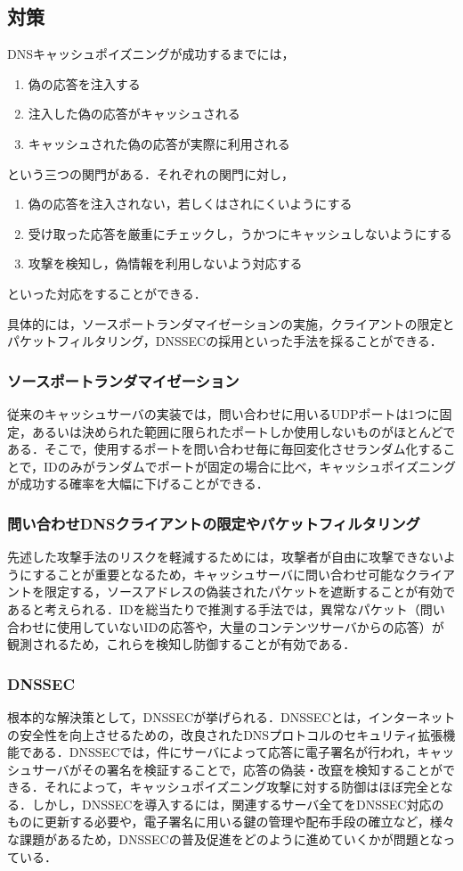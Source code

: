 \subsection{対策}
DNSキャッシュポイズニングが成功するまでには，
\begin{enumerate}
	\item 偽の応答を注入する
	\item 注入した偽の応答がキャッシュされる
	\item キャッシュされた偽の応答が実際に利用される
\end{enumerate}
という三つの関門がある．それぞれの関門に対し，
\begin{enumerate}
	\item 偽の応答を注入されない，若しくはされにくいようにする
	\item 受け取った応答を厳重にチェックし，うかつにキャッシュしないようにする
	\item 攻撃を検知し，偽情報を利用しないよう対応する
\end{enumerate}
といった対応をすることができる．\cite{jrps}

具体的には，ソースポートランダマイゼーションの実施，クライアントの限定とパケットフィルタリング，DNSSECの採用といった手法を採ることができる．

\subsubsection{ソースポートランダマイゼーション}
従来のキャッシュサーバの実装では，問い合わせに用いるUDPポートは1つに固定，あるいは決められた範囲に限られたポートしか使用しないものがほとんどである．そこで，使用するポートを問い合わせ毎に毎回変化させランダム化することで，IDのみがランダムでポートが固定の場合に比べ，キャッシュポイズニングが成功する確率を大幅に下げることができる．

\subsubsection{問い合わせDNSクライアントの限定やパケットフィルタリング}
先述した攻撃手法のリスクを軽減するためには，攻撃者が自由に攻撃できないようにすることが重要となるため，キャッシュサーバに問い合わせ可能なクライアントを限定する，ソースアドレスの偽装されたパケットを遮断することが有効であると考えられる．IDを総当たりで推測する手法では，異常なパケット（問い合わせに使用していないIDの応答や，大量のコンテンツサーバからの応答）が観測されるため，これらを検知し防御することが有効である．

\subsubsection{DNSSEC}
根本的な解決策として，DNSSECが挙げられる．DNSSECとは，インターネットの安全性を向上させるための，改良されたDNSプロトコルのセキュリティ拡張機能である．DNSSECでは，件にサーバによって応答に電子署名が行われ，キャッシュサーバがその署名を検証することで，応答の偽装・改竄を検知することができる．それによって，キャッシュポイズニング攻撃に対する防御はほぼ完全となる．しかし，DNSSECを導入するには，関連するサーバ全てをDNSSEC対応のものに更新する必要や，電子署名に用いる鍵の管理や配布手段の確立など，様々な課題があるため，DNSSECの普及促進をどのように進めていくかが問題となっている．


